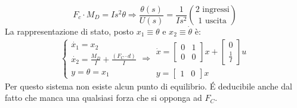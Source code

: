 \documentclass[a4paper]{report}
\begin{document}
\[
  F_c \cdot M_D = I s^2 \theta \Rightarrow \frac{\theta(s)}{U(s)} =
  \frac{1}{Is^2} \binom{\textrm{2 ingressi}}{\textrm{1 uscita}}
\]
La rappresentazione di stato, posto $x_1 \equiv \theta$ e $x_2 \equiv
\dot{\theta}$ \`e:
\[
  \left\{
  \begin{array}{l}
    \dot{x_1} = x_2\\
    \dot{x_2} = \frac{M_D}{I} + \frac{(F_C \cdot d)}{I}\\
    y = \theta = x_1
  \end{array}\right .
  \Rightarrow
  \begin{array}{l}
    \dot{x} = 
    \begin{bmatrix}
      0 & 1\\
      0 & 0
    \end{bmatrix}x +
    \begin{bmatrix}
      0\\
      \frac{1}{I}
    \end{bmatrix}u\\
    y =
    \begin{bmatrix}
      1 & 0
    \end{bmatrix}x
  \end{array}
\]
Per questo sistema non esiste alcun punto di equilibrio. \'E
deducibile anche dal fatto che manca una qualsiasi forza che si
opponga ad $F_C$.
\end{document}
